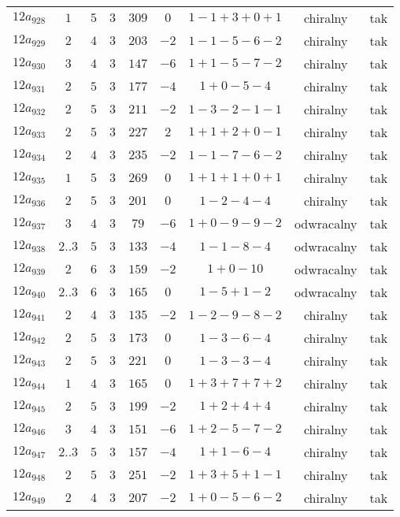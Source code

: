 \begin{longtable}{ccccccccc}
$12a_{928}$ & $1$ & $5$ & $3$ & $309$ & $0$ & $1-1+3+0+1$ & chiralny & tak \\
$12a_{929}$ & $2$ & $4$ & $3$ & $203$ & $-2$ & $1-1-5-6-2$ & chiralny & tak \\
$12a_{930}$ & $3$ & $4$ & $3$ & $147$ & $-6$ & $1+1-5-7-2$ & chiralny & tak \\
$12a_{931}$ & $2$ & $5$ & $3$ & $177$ & $-4$ & $1+0-5-4$ & chiralny & tak \\
$12a_{932}$ & $2$ & $5$ & $3$ & $211$ & $-2$ & $1-3-2-1-1$ & chiralny & tak \\
$12a_{933}$ & $2$ & $5$ & $3$ & $227$ & $2$ & $1+1+2+0-1$ & chiralny & tak \\
$12a_{934}$ & $2$ & $4$ & $3$ & $235$ & $-2$ & $1-1-7-6-2$ & chiralny & tak \\
$12a_{935}$ & $1$ & $5$ & $3$ & $269$ & $0$ & $1+1+1+0+1$ & chiralny & tak \\
$12a_{936}$ & $2$ & $5$ & $3$ & $201$ & $0$ & $1-2-4-4$ & chiralny & tak \\
$12a_{937}$ & $3$ & $4$ & $3$ & $79$ & $-6$ & $1+0-9-9-2$ & odwracalny & tak \\
$12a_{938}$ & $2..3$ & $5$ & $3$ & $133$ & $-4$ & $1-1-8-4$ & odwracalny & tak \\
$12a_{939}$ & $2$ & $6$ & $3$ & $159$ & $-2$ & $1+0-10$ & odwracalny & tak \\
$12a_{940}$ & $2..3$ & $6$ & $3$ & $165$ & $0$ & $1-5+1-2$ & odwracalny & tak \\
$12a_{941}$ & $2$ & $4$ & $3$ & $135$ & $-2$ & $1-2-9-8-2$ & chiralny & tak \\
$12a_{942}$ & $2$ & $5$ & $3$ & $173$ & $0$ & $1-3-6-4$ & chiralny & tak \\
$12a_{943}$ & $2$ & $5$ & $3$ & $221$ & $0$ & $1-3-3-4$ & chiralny & tak \\
$12a_{944}$ & $1$ & $4$ & $3$ & $165$ & $0$ & $1+3+7+7+2$ & chiralny & tak \\
$12a_{945}$ & $2$ & $5$ & $3$ & $199$ & $-2$ & $1+2+4+4$ & chiralny & tak \\
$12a_{946}$ & $3$ & $4$ & $3$ & $151$ & $-6$ & $1+2-5-7-2$ & chiralny & tak \\
$12a_{947}$ & $2..3$ & $5$ & $3$ & $157$ & $-4$ & $1+1-6-4$ & chiralny & tak \\
$12a_{948}$ & $2$ & $5$ & $3$ & $251$ & $-2$ & $1+3+5+1-1$ & chiralny & tak \\
$12a_{949}$ & $2$ & $4$ & $3$ & $207$ & $-2$ & $1+0-5-6-2$ & chiralny & tak \\

\end{longtable}
